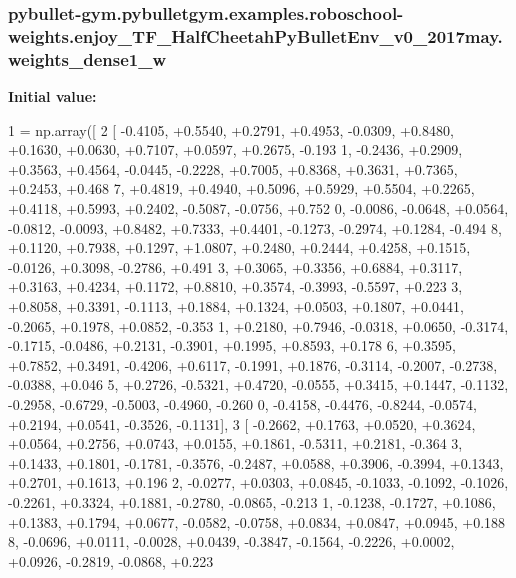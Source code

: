 \subsubsection[{\texorpdfstring{weights\+\_\+dense1\+\_\+w}{weights_dense1_w}}]{\setlength{\rightskip}{0pt plus 5cm}pybullet-\/gym.\+pybulletgym.\+examples.\+roboschool-\/weights.\+enjoy\+\_\+\+T\+F\+\_\+\+Half\+Cheetah\+Py\+Bullet\+Env\+\_\+v0\+\_\+2017may.\+weights\+\_\+dense1\+\_\+w}\hypertarget{namespacepybullet-gym_1_1pybulletgym_1_1examples_1_1roboschool-weights_1_1enjoy___t_f___half_cheetah_py_bullet_env__v0__2017may_ae59de4917f8ae04537d1d9acf95a88ae}{}\label{namespacepybullet-gym_1_1pybulletgym_1_1examples_1_1roboschool-weights_1_1enjoy___t_f___half_cheetah_py_bullet_env__v0__2017may_ae59de4917f8ae04537d1d9acf95a88ae}
{\bfseries Initial value\+:}
\begin{DoxyCode}
1 = np.array([
2 [ -0.4105, +0.5540, +0.2791, +0.4953, -0.0309, +0.8480, +0.1630, +0.0630, +0.7107, +0.0597, +0.2675, -0.193
      1, -0.2436, +0.2909, +0.3563, +0.4564, -0.0445, -0.2228, +0.7005, +0.8368, +0.3631, +0.7365, +0.2453, +0.468
      7, +0.4819, +0.4940, +0.5096, +0.5929, +0.5504, +0.2265, +0.4118, +0.5993, +0.2402, -0.5087, -0.0756, +0.752
      0, -0.0086, -0.0648, +0.0564, -0.0812, -0.0093, +0.8482, +0.7333, +0.4401, -0.1273, -0.2974, +0.1284, -0.494
      8, +0.1120, +0.7938, +0.1297, +1.0807, +0.2480, +0.2444, +0.4258, +0.1515, -0.0126, +0.3098, -0.2786, +0.491
      3, +0.3065, +0.3356, +0.6884, +0.3117, +0.3163, +0.4234, +0.1172, +0.8810, +0.3574, -0.3993, -0.5597, +0.223
      3, +0.8058, +0.3391, -0.1113, +0.1884, +0.1324, +0.0503, +0.1807, +0.0441, -0.2065, +0.1978, +0.0852, -0.353
      1, +0.2180, +0.7946, -0.0318, +0.0650, -0.3174, -0.1715, -0.0486, +0.2131, -0.3901, +0.1995, +0.8593, +0.178
      6, +0.3595, +0.7852, +0.3491, -0.4206, +0.6117, -0.1991, +0.1876, -0.3114, -0.2007, -0.2738, -0.0388, +0.046
      5, +0.2726, -0.5321, +0.4720, -0.0555, +0.3415, +0.1447, -0.1132, -0.2958, -0.6729, -0.5003, -0.4960, -0.260
      0, -0.4158, -0.4476, -0.8244, -0.0574, +0.2194, +0.0541, -0.3526, -0.1131],
3 [ -0.2662, +0.1763, +0.0520, +0.3624, +0.0564, +0.2756, +0.0743, +0.0155, +0.1861, -0.5311, +0.2181, -0.364
      3, +0.1433, +0.1801, -0.1781, -0.3576, -0.2487, +0.0588, +0.3906, -0.3994, +0.1343, +0.2701, +0.1613, +0.196
      2, -0.0277, +0.0303, +0.0845, -0.1033, -0.1092, -0.1026, -0.2261, +0.3324, +0.1881, -0.2780, -0.0865, -0.213
      1, -0.1238, -0.1727, +0.1086, +0.1383, +0.1794, +0.0677, -0.0582, -0.0758, +0.0834, +0.0847, +0.0945, +0.188
      8, -0.0696, +0.0111, -0.0028, +0.0439, -0.3847, -0.1564, -0.2226, +0.0002, +0.0926, -0.2819, -0.0868, +0.223

\end{DoxyCode}
